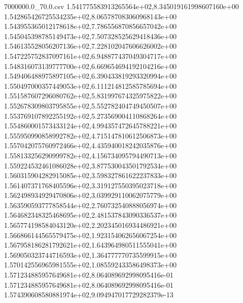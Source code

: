 \begin{filecontents*}{7000000.0_70.0.csv}
1.541775583913265564e+02,8.345019161998607160e+00
1.542865426725534235e+02,8.065787083060968143e+00
1.543955365012178618e+02,7.786556870856657042e+00
1.545045398785149473e+02,7.507328525629418436e+00
1.546135528056207136e+02,7.228102047606626002e+00
1.547225752837097161e+02,6.948877437049304717e+00
1.548316073139777700e+02,6.669654694192104216e+00
1.549406488975897105e+02,6.390433819293320994e+00
1.550497000357449053e+02,6.111214812585785694e+00
1.551587607296080762e+02,5.831997674325975822e+00
1.552678309803795855e+02,5.552782404749450507e+00
1.553769107892255192e+02,5.273569004110868264e+00
1.554860001573433124e+02,4.994357472645788221e+00
1.555950990858992782e+02,4.715147810612506873e+00
1.557042075760972466e+02,4.435940018242035876e+00
1.558133256290999782e+02,4.156734095794490713e+00
1.559224532461086028e+02,3.877530043501792534e+00
1.560315904282915085e+02,3.598327861622237833e+00
1.561407371768405596e+02,3.319127550395023718e+00
1.562498934929470806e+02,3.039929110062075779e+00
1.563590593777858544e+02,2.760732540888056974e+00
1.564682348325468695e+02,2.481537843090336537e+00
1.565774198584043120e+02,2.202345016934486921e+00
1.566866144565579475e+02,1.923154062656067254e+00
1.567958186281792621e+02,1.643964980511555041e+00
1.569050323744716593e+02,1.364777770735599915e+00
1.570142556965981555e+02,1.085592433586498373e+00
1.571234885957649681e+02,8.064089692998095416e-01
1.571234885957649681e+02,8.064089692998095416e-01
1.574390608580881974e+02,9.094947017729282379e-13
\end{filecontents*}

